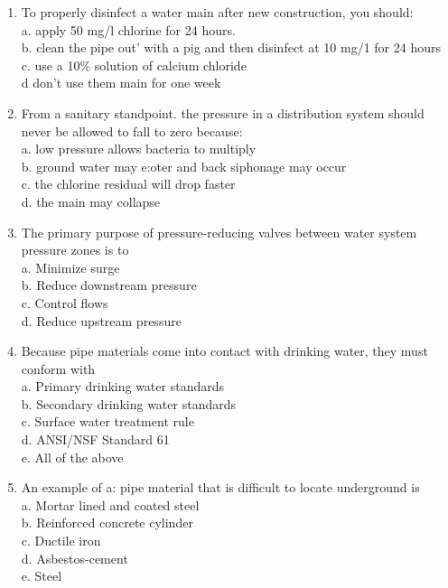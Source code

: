 \begin{enumerate}[1.]
\item To properly disinfect a water main after new construction, you should:\\
a.	 apply 50 mg/l chlorine for 24 hours.\\
b. 	clean the pipe out' with a pig and then disinfect at 10 mg/1 for 24 hours\\
c.	use a 10\% solution of calcium chloride \\
d	 don't use them main for one week\\

\item From a sanitary standpoint. the pressure in a distribution system should never be allowed to fall to zero because:\\
a.	low pressure allows bacteria to multiply\\
b.	ground water may e:oter and back siphonage may occur\\
c.	the chlorine residual will drop faster\\
d.	the main may collapse\\

\item The primary purpose of pressure-reducing valves between water system pressure zones is to\\
a. Minimize surge\\
b. Reduce downstream pressure\\
c. Control flows\\
d. Reduce upstream pressure

\item Because pipe materials come into contact with drinking water, they must conform with\\
a. Primary drinking water standards\\
b. Secondary drinking water standards\\
c. Surface water treatment rule\\
d. ANSI/NSF Standard 61\\
e. All of the above\\

\item An example of a: pipe material that is difficult to locate underground is\\
a. Mortar lined and coated steel\\
b. Reinforced concrete cylinder\\
c. Ductile iron\\
d. Asbestos-cement\\
e. Steel\\


\end{enumerate}
